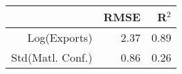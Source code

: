 \begin{table}[ht]
\centering
\begin{tabular}{rrr}
  \hline
 & RMSE & R$^{2}$ \\ 
  \hline
Log(Exports) & 2.37 & 0.89 \\ 
  Std(Matl. Conf.) & 0.86 & 0.26 \\ 
   \hline
\end{tabular}
\end{table}
